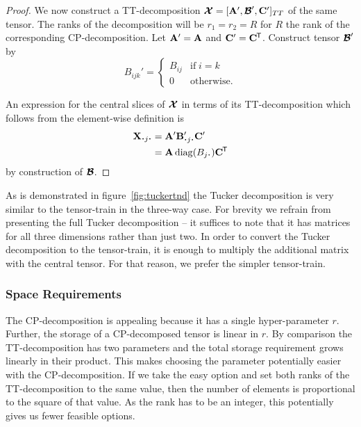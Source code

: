 {\begin{proof}
We now construct a TT-decomposition \(\bm{\mathcal{X}} = [\mathbf{A}', \bm{\mathcal{B}}', \mathbf{C}']_{TT}\)
of the same tensor. The ranks of the decomposition will be \(r_1 = r_2 = R\) for \(R\) the rank
of the corresponding CP-decomposition.
Let \(\mathbf{A}' = \mathbf{A}\) and \(\mathbf{C}' = \mathbf{C}^{\mkern-1.5mu\mathsf{T}}\). Construct tensor \(\bm{\mathcal{B}}'\)
by
\begin{equation}
	B_{ijk}' = \begin{cases}
		B_{ij} & \text{if}\; i = k \\
		0    & \text{otherwise}.
	\end{cases}
\end{equation}

An expression for the central slices of \(\bm{\mathcal{X}}\) in terms of its TT-decomposition which
follows from the element-wise definition is
\begin{align}
	\mat{X}_{\midbullet j \midbullet} &= \mat{A}'\mat{B}_{\midbullet j \midbullet}'\mat{C}'\\
	&= \mat{A}\diag(B_{j\midbullet})\tran{\mat{C}}
\end{align}
by construction of \(\bm{\mathcal{B}}\).
\end{proof}

As is demonstrated in figure~\ref{fig:tuckertnd} the Tucker decomposition is very similar to the 
tensor-train in the three-way case. For brevity we refrain from presenting the full Tucker
decomposition -- it suffices to note that it has matrices for all three dimensions rather than
just two. In order to convert the Tucker decomposition to the tensor-train, it is enough to multiply
the additional matrix with the central tensor. For that reason, we prefer the simpler tensor-train.

\subsubsection{Space Requirements}
The CP-decomposition is appealing because it has a single hyper-parameter \(r\). Further, the
storage of a CP-decomposed tensor is linear in \(r\). By comparison the TT-decomposition has
two parameters and the total storage requirement grows linearly in their product. This makes
choosing the parameter potentially easier with the CP-decomposition. If we take the easy option
and set both ranks of the TT-decomposition to the same value, then the number of elements is
proportional to the square of that value. As the rank has to be an integer, this potentially gives
us fewer feasible options.

}
